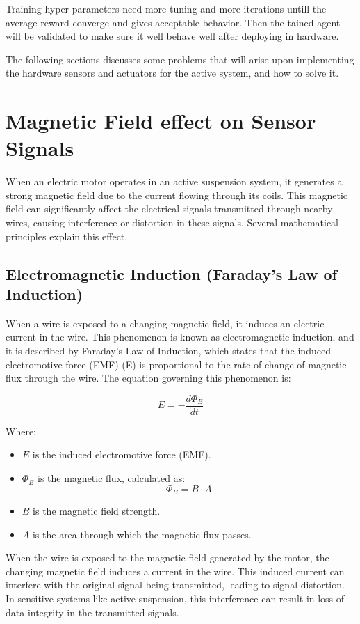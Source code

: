 Training hyper parameters need more tuning and more iterations untill the average reward converge and gives acceptable behavior. Then the tained agent will be validated to make sure it well behave well after deploying in hardware.\newline



The following sections discusses some problems that will arise upon implementing the hardware sensors and actuators for the active system, and how to solve it.

\section {Magnetic Field effect on Sensor Signals}
When an electric motor operates in an active suspension system, it generates a strong magnetic field due to the current flowing through its coils. This magnetic field can significantly affect the electrical signals transmitted through nearby wires, causing interference or distortion in these signals. Several mathematical principles explain this effect.

\subsection{Electromagnetic Induction (Faraday's Law of Induction)}

When a wire is exposed to a changing magnetic field, it induces an electric current in the wire. This phenomenon is known as electromagnetic induction, and it is described by Faraday’s Law of Induction, which states that the induced electromotive force (EMF) (E) is proportional to the rate of change of magnetic flux through the wire. The equation governing this phenomenon is:

\[
E = - \frac{d\Phi_B}{dt}
\]

Where:
\begin{itemize}
	\item \( E \) is the induced electromotive force (EMF).
	\item \( \Phi_B \) is the magnetic flux, calculated as:
	\[
	\Phi_B = B \cdot A
	\]
	\item \( B \) is the magnetic field strength.
	\item \( A \) is the area through which the magnetic flux passes.
\end{itemize}

When the wire is exposed to the magnetic field generated by the motor, the changing magnetic field induces a current in the wire. This induced current can interfere with the original signal being transmitted, leading to signal distortion. In sensitive systems like active suspension, this interference can result in loss of data integrity in the transmitted signals.


